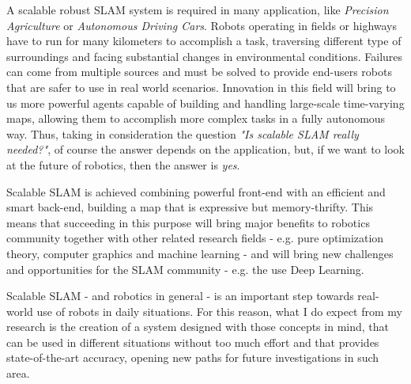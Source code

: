 \documentclass[10pt,a4paper, notitlepage]{report}
\begin{document}
A scalable robust SLAM system is required in many application, like \textit{Precision Agriculture} or \textit{Autonomous Driving Cars}. Robots operating in fields or highways have to run for many kilometers to accomplish a task, traversing different type of surroundings and facing substantial changes in environmental conditions. Failures can come from multiple sources and must be solved to provide end-users robots that are safer to use in real world scenarios. Innovation in this field will bring to us more powerful agents capable of building and handling large-scale time-varying maps, allowing them to accomplish more complex tasks in a fully autonomous way. Thus, taking in consideration the question \textit{"Is scalable SLAM really needed?"}, of course the answer depends on the application, but, if we want to look at the future of robotics, then the answer is \textit{yes}.

Scalable SLAM is achieved combining powerful front-end with an efficient and smart back-end, building a map that is expressive but memory-thrifty. This means that succeeding in this purpose will bring major benefits to robotics community together with other related research fields - e.g. pure optimization theory, computer graphics and machine learning -  and will bring new challenges and opportunities for the SLAM community - e.g. the use Deep Learning. 

\vspace{15px}

Scalable SLAM - and robotics in general - is an important step towards real-world use of robots in daily situations. For this reason, what I do expect from my research is the creation of a system designed with those concepts in mind, that can be used in different situations without too much effort and that provides state-of-the-art accuracy, opening new paths for future investigations in such area.






\end{document}
